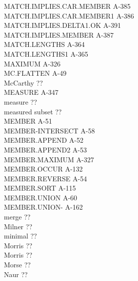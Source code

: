 \documentclass[10pt]{book}
\newenvironment{pubasis}{\begin{flushleft}}{\end{flushleft}}
\begin{document}
\begin{pubasis}
MATCH.IMPLIES.CAR.MEMBER                     A-385\\
MATCH.IMPLIES.CAR.MEMBER1                    A-386\\
MATCH.IMPLIES.DELTA1.OK                      A-391\\
MATCH.IMPLIES.MEMBER                         A-387\\
MATCH.LENGTHS                                A-364\\
MATCH.LENGTHS1                               A-365\\
MAXIMUM                                      A-326\\
MC.FLATTEN                                   A-49\\
McCarthy                                     ??\\
MEASURE                                      A-347\\
measure                                      ??\\
measured subset                              ??\\
MEMBER                                       A-51\\
MEMBER-INTERSECT                             A-58\\
MEMBER.APPEND                                A-52\\
MEMBER.APPEND2                               A-53\\
MEMBER.MAXIMUM                               A-327\\
MEMBER.OCCUR                                 A-132\\
MEMBER.REVERSE                               A-54\\
MEMBER.SORT                                  A-115\\
MEMBER.UNION                                 A-60\\
MEMBER.UNION-                                A-162\\
merge                                        ??\\
Milner                                       ??\\
minimal                                      ??\\
Morris                                       ??\\
Morris                                       ??\\
Morse                                        ??\\
Naur                                         ??\\

\end{pubasis}
\end{document}
